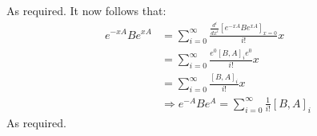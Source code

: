 \documentclass[a4paper,12pt]{article}
\begin{document}
\begin{minipage}[t]{0.9\textwidth}
\begin{minipage}[t]{\textwidth}
\begin{align*}
    \end{align*}
    As required.
    It now follows that:
    \begin{align*}
      e^{-x A} B e^{xA} &= \sum_{i = 0}^{\infty}\frac{\frac{d^{i}}{dx^{i}}\left[e^{-x A} B e^{xA} \right]_{x = 0}}{i!} x\\
                        &= \sum_{i = 0}^{\infty}\frac{e^{0} [B,A]_i e^{0} }{i!} x\\
                        &= \sum_{i = 0}^{\infty}\frac{[B,A]_i}{i!} x\\
                        &\Rightarrow e^{-A} B e^{A} = \sum_{i = 0}^{\infty}\frac{1}{i!}[B,A]_i
    \end{align*}
    As required.
  \end{minipage}
\end{minipage}
\end{document}

